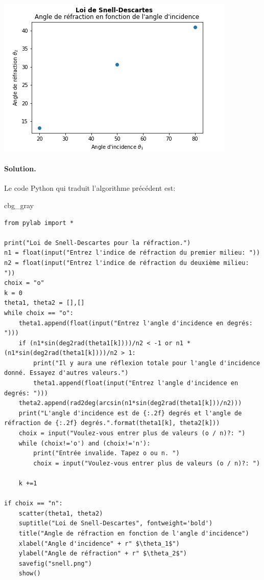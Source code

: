 \documentclass[%
oneside,                 %
final,                   %
10pt,french]{article}
\newenvironment{_cod_tight}[1]{
   \def\FrameCommand{\colorbox{#1}}
   \FrameRule0.6pt\MakeFramed {\FrameRestore}\vskip3mm}
   {\vskip0mm\endMakeFramed}
\newenvironment{cod}[1]{
\bgroup\rmfamily
\fboxsep=0mm\relax
\begin{_cod_tight}{#1}
\list{}{\parsep=-2mm\parskip=0mm\topsep=0pt\leftmargin=2mm
\rightmargin=2\leftmargin\leftmargin=4pt\relax}
\item\relax}
{\endlist\end{_cod_tight}\egroup}
\newenvironment{doconceexercise}{}{}
\begin{document}
\begin{doconceexercise}
\begin{itemize}
\noindent
\end{itemize}

\noindent
\vspace{6mm}

\centerline{\includegraphics[width=0.7\linewidth]{figs/snell.png}}

\vspace{6mm}




\paragraph{Solution.}
Le code Python qui traduit l'algorithme précédent est:
\begin{cod}{cbg_gray}\begin{verbatim}
from pylab import *

print("Loi de Snell-Descartes pour la réfraction.")
n1 = float(input("Entrez l'indice de réfraction du premier milieu: "))
n2 = float(input("Entrez l'indice de réfraction du deuxième milieu: "))
choix = "o"
k = 0
theta1, theta2 = [],[]
while choix == "o":
    theta1.append(float(input("Entrez l'angle d'incidence en degrés: ")))
    if (n1*sin(deg2rad(theta1[k])))/n2 < -1 or n1 * (n1*sin(deg2rad(theta1[k])))/n2 > 1:
        print("Il y aura une réflexion totale pour l'angle d'incidence donné. Essayez d'autres valeurs.")
        theta1.append(float(input("Entrez l'angle d'incidence en degrés: ")))
    theta2.append(rad2deg(arcsin(n1*sin(deg2rad(theta1[k]))/n2)))
    print("L'angle d'incidence est de {:.2f} degrés et l'angle de réfraction de {:.2f} degrés.".format(theta1[k], theta2[k]))
    choix = input("Voulez-vous entrer plus de valeurs (o / n)?: ")
    while (choix!='o') and (choix!='n'):
        print("Entrée invalide. Tapez o ou n. ")
        choix = input("Voulez-vous entrer plus de valeurs (o / n)?: ")

    k +=1

if choix == "n":
    scatter(theta1, theta2)
    suptitle("Loi de Snell-Descartes", fontweight='bold')
    title("Angle de réfraction en fonction de l'angle d'incidence")
    xlabel("Angle d'incidence" + r" $\theta_1$")
    ylabel("Angle de réfraction" + r" $\theta_2$")
    savefig("snell.png")
    show()
\end{verbatim}
\end{cod}
\noindent


\end{doconceexercise}
\end{document}
